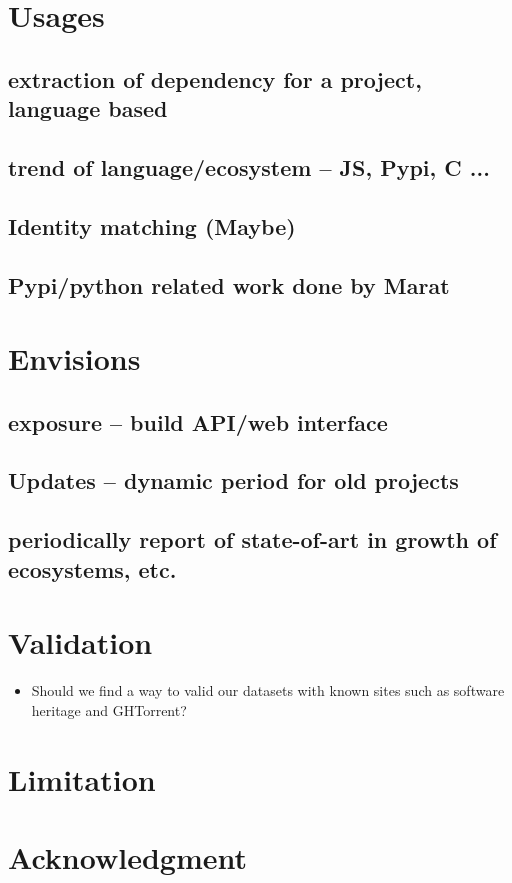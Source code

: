 \documentclass[conference]{IEEEtran}
\begin{document}
\section{Usages}
\subsection{extraction of dependency for a project, language based}
\subsection{trend of language/ecosystem -- JS, Pypi, C ...}
\subsection{Identity matching (Maybe)}
\subsection{Pypi/python related work done by Marat}

\section{Envisions}
\subsection{exposure -- build API/web interface}
\subsection{Updates -- dynamic period for old projects}
\subsection{periodically report of state-of-art in growth of ecosystems, etc.}

\section{Validation}
\begin{itemize}
    \item Should we find a way to valid our datasets with known sites such as software heritage and GHTorrent?
\end{itemize}

\section{Limitation}

\section*{Acknowledgment}


\end{document}
